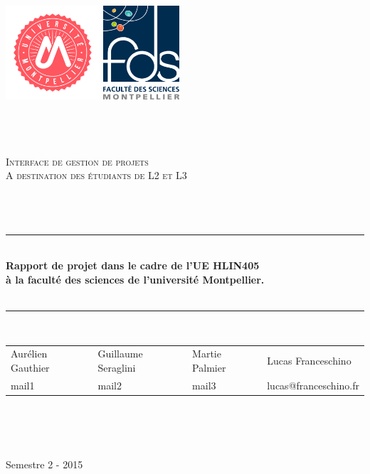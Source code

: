 \begin{titlepage}
\begin{center}

\href{http://www.umontpellier.fr/}{\includegraphics[height=3.5cm]{images/Logo_UM.png}}
\href{http://www.fdsweb.univ-montp2.fr/}{\includegraphics[height=3.5cm]{images/LogoFDS.png}}

~\\~\\~\\

\textsc{\huge Interface de gestion de projets
\\
\normalsize A destination des étudiants de L2 et L3}\\[1.5cm]
~\\~\\~\\

\hrule ~ \\[0.7cm]
{ \large \bfseries 
	Rapport de projet dans le cadre de l'UE HLIN405\\ à la faculté des sciences de l'université Montpellier.
\\[0.7cm] }~\\

\hrule ~ \\[1.4cm]


\begin{tabularx}{\textwidth}{YYYY}
   Aurélien Gauthier & Guillaume Seraglini & Martie Palmier & Lucas Franceschino\\
   \small mail1 & \small mail2 & \small mail3 & \small lucas@franceschino.fr
\end{tabularx}

~\\~\\~\\

\vfill

{\large Semestre 2 - 2015}

\end{center}
\end{titlepage}